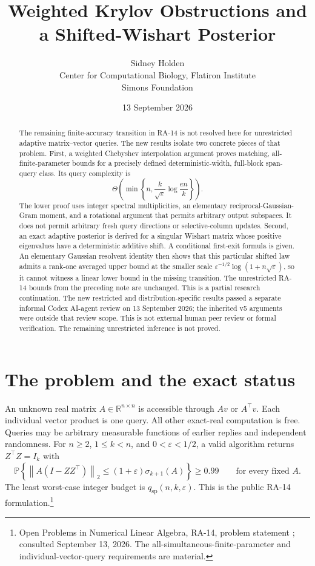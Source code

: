 \documentclass[11pt]{article}
\title{Weighted Krylov Obstructions and a Shifted-Wishart Posterior}
\author{Sidney Holden\\{\small Center for Computational Biology, Flatiron Institute}\\{\small Simons Foundation}}
\date{13 September 2026}
\theoremstyle{definition}
\newcommand{\R}{\mathbb R}
\newcommand{\Prob}{\mathbb P}
\newcommand{\qsp}{q_{\mathrm{sp}}}
\newcommand{\norm}[1]{\left\lVert#1\right\rVert}
\begin{document}
\maketitle
\vspace{-0.5em}
\begin{abstract}
The remaining finite-accuracy transition in RA-14 is not resolved here for unrestricted adaptive matrix--vector queries. The new results isolate two concrete pieces of that problem. First, a weighted Chebyshev interpolation argument proves matching, all-finite-parameter bounds for a precisely defined deterministic-width, full-block span-query class. Its query complexity is
\[
\Theta\!\left(\min\left\{n,\frac{k}{\sqrt\varepsilon}\log\frac{en}{k}\right\}\right).
\]
The lower proof uses integer spectral multiplicities, an elementary reciprocal-Gaussian-Gram moment, and a rotational argument that permits arbitrary output subspaces. It does not permit arbitrary fresh query directions or selective-column updates. Second, an exact adaptive posterior is derived for a singular Wishart matrix whose positive eigenvalues have a deterministic additive shift. A conditional first-exit formula is given. An elementary Gaussian resolvent identity then shows that this particular shifted law admits a rank-one averaged upper bound at the smaller scale $\varepsilon^{-1/2}\log(1+n\sqrt\varepsilon)$, so it cannot witness a linear lower bound in the missing transition. The unrestricted RA-14 bounds from the preceding note are unchanged. This is a partial research continuation. The new restricted and distribution-specific results passed a separate informal Codex AI-agent review on 13 September 2026; the inherited v5 arguments were outside that review scope. This is not external human peer review or formal verification. The remaining unrestricted inference is not proved.
\end{abstract}
\setcounter{tocdepth}{1}
\begingroup\small
\setlength{\parskip}{0pt}
\makeatletter
\renewcommand*{\l@section}[2]{\@dottedtocline{1}{0em}{2.3em}{#1}{#2}}
\makeatother
\tableofcontents
\endgroup
\newpage

\section{The problem and the exact status}
An unknown real matrix $A\in\R^{n\times n}$ is accessible through $Av$ or $A^\top v$. Each individual vector product is one query. All other exact-real computation is free. Queries may be arbitrary measurable functions of earlier replies and independent randomness. For $n\ge2$, $1\le k<n$, and $0<\varepsilon<1/2$, a valid algorithm returns $Z^\top Z=I_k$ with
\begin{equation}\label{eq:target}
\Prob\left\{\norm{A(I-ZZ^\top)}_2\le(1+\varepsilon)\sigma_{k+1}(A)\right\}\ge0.99
\qquad\text{for every fixed }A.
\end{equation}
The least worst-case integer budget is $\qsp(n,k,\varepsilon)$. This is the public RA-14 formulation.\footnote{Open Problems in Numerical Linear Algebra, RA-14, problem statement \cite{repo}; consulted September 13, 2026. The all-simultaneous-finite-parameter and individual-vector-query requirements are material.}
\end{document}

